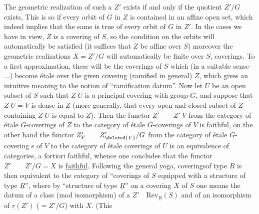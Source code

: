 The geometric realization of such a $Z'$ exists if and only if the quotient $Z'/G$ exists,  This is so if every orbit of $G$ in $Z$ is contained in an affine open set, which indeed implies that the same is true of every orbit of $G$ in $Z'$.  In the cases we have in view, $Z$ is a covering of $S$, so the condition on the orbits will automatically be satisfied (it suffices that $Z$ be affine over $S$) moreover the geometric realizations $X=Z'/G$ will automatically be finite over $S$,   coverings. To a first approximation, these will be the coverings of $S$ which (in  a suitable sense ...) become étale over the given covering (ramified in general) $Z$, which gives an intuitive meaning to the notion of ``ramification datum''. Now let $U$ be an open subset of $S$ such that $Z\;U$ is a principal covering with group $G$, and suppose that $Z\;U=V$ is dense in $Z$ (more generally, that every open and closed subset of $Z$ containing $Z\;U$  is equal to $Z$). Then the functor $Z'\qquad Z'\;V$ from the category of étale $G$-coverings of $Z$ to the category of étale $G$-coverings of $V$ is faithful, on the other hand the functor $Z'_V\qquad Z'_{\deleted{V}}/G$ from the category of étale $G$-covering s of $V$ to the category of étale coverings of $U$ is an equivalence of categories, a fortiori faithful, whence one concludes that the  functor $Z'\qquad Z'/G=X$ is \uline{faithful}. Following the general yoga,  coveringsof type $\underline{R}$  is then equivalent to the category of ``coverings of $S$ equipped with a structure of type $\underline{R}$'', where by ``structure of type $\underline{R}$'' on a covering $X$ of $S$ one means the datum of a class (mod isomorphism) of a $Z'\quad\mathrm{Rev}_{\underline{R}}(S)$ and of an isomorphism of $\underline{r}(Z')$ ($=Z'/G$) with $X$. (This
